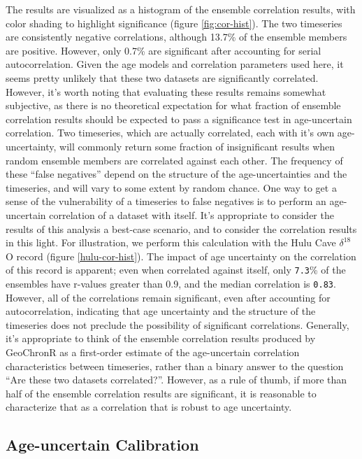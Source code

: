 \documentclass[gchron, manuscript]{copernicus}
\begin{document}
The results are visualized as a histogram of the ensemble correlation results, with color shading to highlight significance (figure \ref{fig:cor-hist}).
The two timeseries are consistently negative correlations, although 13.7\% of the ensemble members are positive.
However, only 0.7\% are significant after accounting for serial autocorrelation.
Given the age models and correlation parameters used here, it seems pretty unlikely that these two datasets are significantly correlated.
However, it's worth noting that evaluating these results remains somewhat subjective, as there is no theoretical expectation for what fraction of ensemble correlation results should be expected to pass a significance test in age-uncertain correlation.
Two timeseries, which are actually correlated, each with it's own age-uncertainty, will commonly return some fraction of insignificant results when random ensemble members are correlated against each other.
The frequency of these ``false negatives'' depend on the structure of the age-uncertainties and the timeseries, and will vary to some extent by random chance.
One way to get a sense of the vulnerability of a timeseries to false negatives is to perform an age-uncertain correlation of a dataset with itself.
It's appropriate to consider the results of this analysis a best-case scenario, and to consider the correlation results in this light.
For illustration, we perform this calculation with the Hulu Cave \(\delta^{18}\)O record (figure \ref{hulu-cor-hist}).
The impact of age uncertainty on the correlation of this record is apparent; even when correlated against itself, only \texttt{7.3}\% of the ensembles have r-values greater than 0.9, and the median correlation is \texttt{0.83}.
However, all of the correlations remain significant, even after accounting for autocorrelation, indicating that age uncertainty and the structure of the timeseries does not preclude the possibility of significant correlations.
Generally, it's appropriate to think of the ensemble correlation results produced by GeoChronR as a first-order estimate of the age-uncertain correlation characteristics between timeseries, rather than a binary answer to the question ``Are these two datasets correlated?''.
However, as a rule of thumb, if more than half of the ensemble correlation results are significant, it is reasonable to characterize that as a correlation that is robust to age uncertainty.

\subsection{Age-uncertain Calibration}
\end{document}
